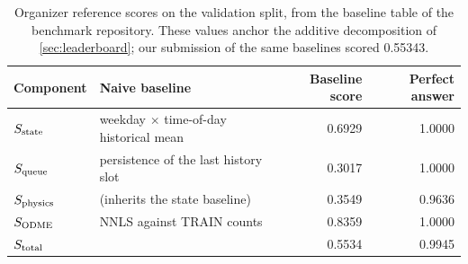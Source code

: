 \begin{table}[h]
\centering\small
\caption{Organizer reference scores on the validation split, from the baseline table of the benchmark repository.
These values anchor the additive decomposition of \cref{sec:leaderboard}; our submission of the same baselines
scored 0.55343.}\label{tab:baselines}
\begin{tabular}{@{}l l r r@{}}
\toprule
Component & Naive baseline & Baseline score & Perfect answer \\
\midrule
$S_{\mathrm{state}}$ & weekday $\times$ time-of-day historical mean & 0.6929 & 1.0000 \\
$S_{\mathrm{queue}}$ & persistence of the last history slot & 0.3017 & 1.0000 \\
$S_{\mathrm{physics}}$ & (inherits the state baseline) & 0.3549 & 0.9636 \\
$S_{\mathrm{ODME}}$ & NNLS against TRAIN counts & 0.8359 & 1.0000 \\
\midrule
$S_{\mathrm{total}}$ & & 0.5534 & 0.9945 \\
\bottomrule
\end{tabular}
\end{table}
